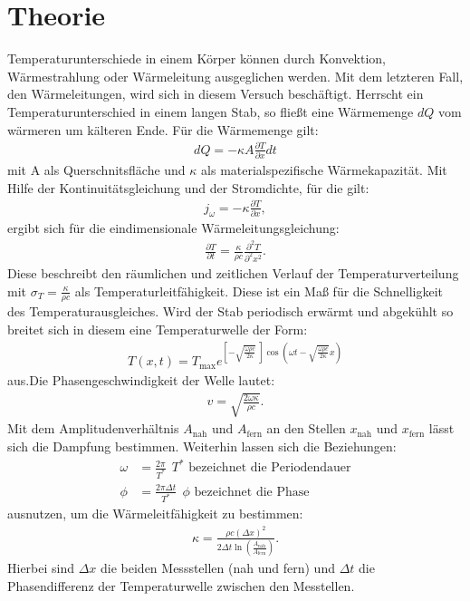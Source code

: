 \section{Theorie}
\label{sec:Theorie}
Temperaturunterschiede in einem Körper können durch Konvektion, Wärmestrahlung oder Wärmeleitung ausgeglichen werden.
Mit dem letzteren Fall, den Wärmeleitungen, wird sich in diesem Versuch beschäftigt.
Herrscht ein Temperaturunterschied in einem langen Stab, so fließt eine Wärmemenge $dQ$ vom wärmeren um kälteren Ende.
Für die Wärmemenge gilt:
\begin{align}
  dQ=-\kappa A\frac{\partial T}{\partial x}dt
\end{align}
mit A als Querschnitsfläche und $\kappa$ als materialspezifische Wärmekapazität.
Mit Hilfe der Kontinuitätsgleichung und der Stromdichte, für die gilt:
\begin{align}
  j_\omega=-\kappa\frac{\partial T}{\partial x},
\end{align}
ergibt sich für die eindimensionale Wärmeleitungsgleichung:
\begin{align}
  \frac{\partial T}{\partial t}=\frac{\kappa}{\rho c} \frac{\partial^2 T}{\partial^2 x^2}\label{eqn:wärmeleitungsgleichung}.
\end{align}
Diese beschreibt den räumlichen und zeitlichen Verlauf der Temperaturverteilung mit $\sigma_T=\frac{\kappa}{\rho c}$ als
Temperaturleitfähigkeit. Diese ist ein Maß für die Schnelligkeit des Temperaturausgleiches.
Wird der Stab periodisch erwärmt und abgekühlt so breitet sich in diesem eine Temperaturwelle der Form:
\begin{align}
  T(x,t)=T_\mathrm{max} e^{\left[-\sqrt{\frac{\omega\rho c}{2\kappa}} \ \right]\cos\left(\omega t-\sqrt{\frac{\omega\rho c}{2\kappa}} x\right)}
\end{align}
aus.Die Phasengeschwindigkeit der Welle lautet:
\begin{align}
  v=\sqrt{\frac{2\omega\kappa}{\rho c}}.
\end{align}
Mit dem Amplitudenverhältnis $A_\mathrm{nah}$ und $A_\mathrm{fern}$ an den Stellen $x_\mathrm{nah}$ und $x_\mathrm{fern}$
lässt sich die Dampfung bestimmen. Weiterhin lassen sich die Beziehungen:
\begin{align}
  \omega&=\frac{2\pi}{T^{*}} \ \ \text{$T^{*}$ bezeichnet die Periodendauer} \\
  \phi&=\frac{2\pi\Delta t}{T^{*}} \ \ \text{$\phi$ bezeichnet die Phase}
\end{align}
ausnutzen, um die Wärmeleitfähigkeit zu bestimmen:
\begin{align}
  \kappa=\frac{\rho c(\Delta x)^2}{2\Delta t \ln{\left(\frac{A_\mathrm{nah}}{A_\mathrm{fern}}\right)}}.
\end{align}
Hierbei sind $\Delta x$ die beiden Messstellen (nah und fern) und $\Delta t$ die Phasendifferenz der Temperaturwelle zwischen den Messtellen.
